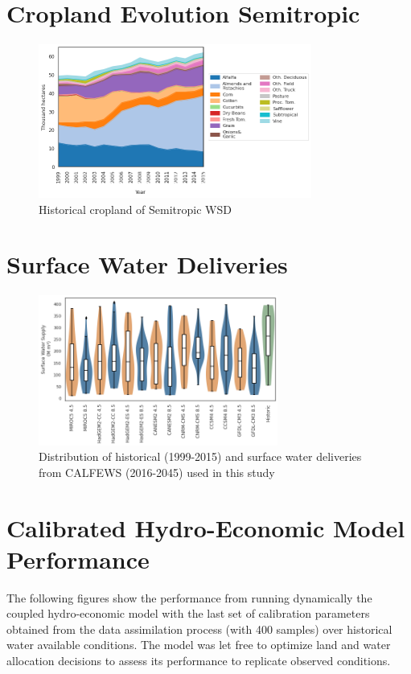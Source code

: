 \documentclass[11pt,a4paper]{article}
\begin{document}
\section{Cropland Evolution Semitropic}

\begin{figure}[H]
    \centering
    \includegraphics[width=0.8\textwidth]{land_hist_semitropic.png}
    \caption{Historical cropland of Semitropic WSD}
    \label{fig:m1esh1}
\end{figure}

\section{Surface Water Deliveries}

\begin{figure}[H]
    \centering
    \includegraphics[width=0.7\textwidth]{gcm_surface_water.png}
    \caption{Distribution of historical (1999-2015) and surface water deliveries from CALFEWS (2016-2045) used in this study} \label{fig:SWSemitropic}
\end{figure}

\section{Calibrated Hydro-Economic Model Performance}

The following figures show the performance from running dynamically the coupled hydro-economic model with the last set of calibration parameters obtained from the data assimilation process (with 400 samples) over historical water available conditions. The model was let free to optimize land and water allocation decisions to assess its performance to replicate observed conditions. 
\end{document}
